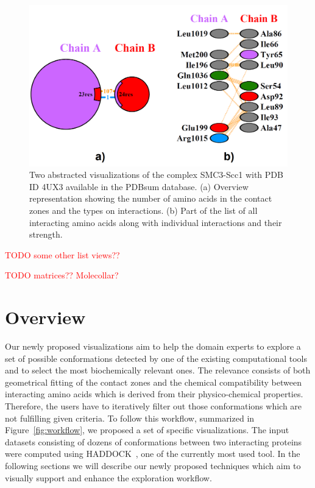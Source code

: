 \documentclass[journal]{vgtc}                %
\begin{document}
\begin{figure}[bt]
  \centering
  \includegraphics[width=1.0\columnwidth]{pdbsum.png}
  \caption{Two abstracted visualizations of the complex SMC3-Scc1 with PDB ID 4UX3 available in the PDBsum database. (a) Overview representation showing the number of amino acids in the contact zones and the types on interactions. (b) Part of the list of all interacting amino acids along with individual interactions and their strength.}
  \label{fig:pdbsum}
\end{figure}

\textcolor{red}{TODO some other list views??}

\textcolor{red}{TODO matrices?? Molecollar?}

\section{Overview}
Our newly proposed visualizations aim to help the domain experts to explore a set of possible conformations detected by one of the existing computational tools and to select the most biochemically relevant ones.
The relevance consists of both geometrical fitting of the contact zones and the chemical compatibility between interacting amino acids which is derived from their physico-chemical properties.
Therefore, the users have to iteratively filter out those conformations which are not fulfilling given criteria.
To follow this workflow, summarized in Figure~\ref{fig:workflow}, we proposed a set of specific visualizations. 
The input datasets consisting of dozens of conformations between two interacting proteins were computed using HADDOCK~\cite{haddock}, one of the currently most used tool.
In the following sections we will describe our newly proposed techniques which aim to visually support and enhance the exploration workflow.
\end{document}
